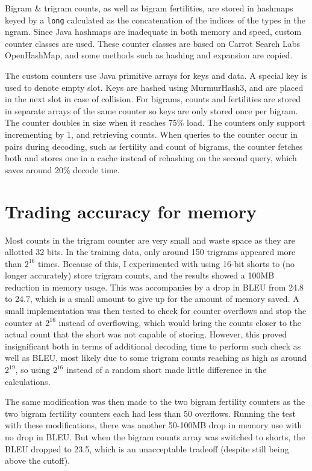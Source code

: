 \documentclass[11pt]{article}
\begin{document}
Bigram \& trigram counts, as well as bigram fertilities, are stored in hashmaps keyed by a \texttt{long} calculated as the concatenation of the indices of the types in the ngram. Since Java hashmaps are inadequate in both memory and speed, custom counter classes are used. These counter classes are based on Carrot Search Labs OpenHashMap, and some methods such as hashing and expansion are copied.

The custom counters use Java primitive arrays for keys and data. A special key is used to denote empty slot. Keys are hashed using MurmurHash3, and are placed in the next slot in case of collision. For bigrams, counts and fertilities are stored in separate arrays of the same counter so keys are only stored once per bigram. The counter doubles in size when it reaches 75\% load. The counters only support incrementing by 1, and retrieving counts. When queries to the counter occur in pairs during decoding, such as fertility and count of bigrams, the counter fetches both and stores one in a cache instead of rehashing on the second query, which saves around 20\% decode time.

\section{Trading accuracy for memory}

Most counts in the trigram counter are very small and waste space as they are allotted 32 bits. In the training data, only around 150 trigrams appeared more than $2^{16}$ times. Because of this, I experimented with using 16-bit shorts to (no longer accurately) store trigram counts, and the results showed a 100MB reduction in memory usage. This was accompanies by a drop in BLEU from 24.8 to 24.7, which is a small amount to give up for the amount of memory saved. A small implementation was then tested to check for counter overflows and stop the counter at $2^{16}$ instead of overflowing, which would bring the counts closer to the actual count that the short was not capable of storing. However, this proved insignificant both in terms of additional decoding time to perform such check as well as BLEU, most likely due to some trigram counts reaching as high as around $2^{19}$, so using $2^{16}$ instead of a random short made little difference in the calculations.

The same modification was then made to the two bigram fertility counters as the two bigram fertility counters each had less than 50 overflows. Running the test with these modifications, there was another 50-100MB drop in memory use with no drop in BLEU. But when the bigram counts array was switched to shorts, the BLEU dropped to 23.5, which is an unacceptable tradeoff (despite still being above the cutoff).
\end{document}

